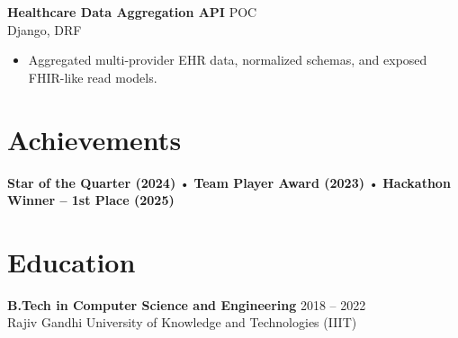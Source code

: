 \documentclass[11pt]{article}
\begin{document}
\textbf{Healthcare Data Aggregation API} \hfill POC \\
Django, DRF
\begin{itemize}
    \item Aggregated multi-provider EHR data, normalized schemas, and exposed FHIR-like read models.
\end{itemize}

\section*{Achievements}
\textbf{Star of the Quarter (2024)} • \textbf{Team Player Award (2023)} • \textbf{Hackathon Winner – 1st Place (2025)}

\section*{Education}
\textbf{B.Tech in Computer Science and Engineering} \hfill 2018 -- 2022 \\
Rajiv Gandhi University of Knowledge and Technologies (IIIT)
\end{document}
